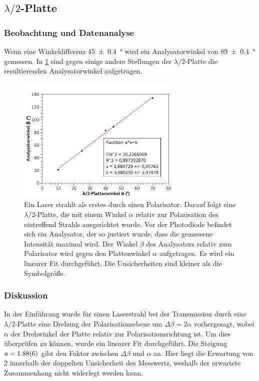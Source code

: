 \documentclass[
	a4paper,
	12pt,
	pagesize,
	ngerman
]{scrartcl}
\begin{document}
	\subsection{$\lambda/2$-Platte}
	\subsubsection{Beobachtung und Datenanalyse}
	Wenn eine Winkeldifferenz \SI{45+-0,4}{\degree}  wird ein Analysatorwinkel von \SI{89+-0,4}{\degree} gemessen.
	In \cref{fig_lambda} sind gegen einige andere Stellungen der $\lambda/2$-Platte die resultierenden Analysatorwinkel aufgetragen.

	\begin{figure}[H]
		\includegraphics[width=0.7\textwidth]{fig_lambda}
		\centering
		\caption{Ein Laser strahlt als erstes durch einen Polarisator. 
		Darauf folgt eine $\lambda/2$-Platte, die mit einem Winkel $\alpha$ relativ zur Polarisation des eintreffend Strahls ausgerichtet wurde. 
		Vor der Photodiode befindet sich ein Analysator, der so justiert wurde, dass die gemessene Intensität maximal wird.
		Der Winkel $\beta$ des Analysators relativ zum Polarisator wird gegen den Plattenwinkel $\alpha$ aufgetragen.
		Es wird ein linearer Fit durchgeführt.
		Die Unsicherheiten sind kleiner als die Symbolgröße.}
		\label{fig_lambda}
		\centering
	\end{figure}

	\subsubsection{Diskussion}
	In der Einführung wurde für einen Laserstrahl bei der Transmission durch eine $\lambda/2$-Platte eine Drehung der Polarisationsebene um $\Delta\beta=2\alpha$ vorhergesagt, wobei $\alpha$ der Drehwinkel der Platte relativ zur Polarisationsrichtung ist.
	Um dies überprüfen zu können, wurde ein linearer Fit durchgeführt.
	Die Steigung $a=\SI{1,88+-0,06}{}$ gibt den Faktor zwischen $\Delta\beta$ und $\alpha$ an.
	Hier liegt die Erwartung von 2 innerhalb der doppelten Unsicherheit des Messwerts, weshalb der erwartete Zusammenhang nicht widerlegt werden kann.
	
\end{document}
